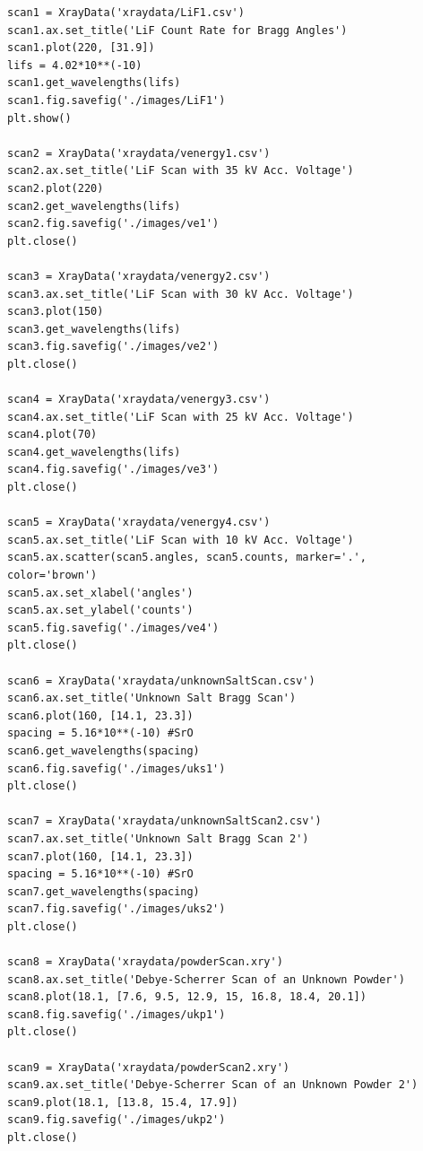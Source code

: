 \documentclass[8pt, a4paper]{article}
\begin{document}
\begin{verbatim}
scan1 = XrayData('xraydata/LiF1.csv')
scan1.ax.set_title('LiF Count Rate for Bragg Angles')
scan1.plot(220, [31.9])
lifs = 4.02*10**(-10)
scan1.get_wavelengths(lifs)
scan1.fig.savefig('./images/LiF1')
plt.show()

scan2 = XrayData('xraydata/venergy1.csv')
scan2.ax.set_title('LiF Scan with 35 kV Acc. Voltage')
scan2.plot(220)
scan2.get_wavelengths(lifs)
scan2.fig.savefig('./images/ve1')
plt.close()

scan3 = XrayData('xraydata/venergy2.csv')
scan3.ax.set_title('LiF Scan with 30 kV Acc. Voltage')
scan3.plot(150)
scan3.get_wavelengths(lifs)
scan3.fig.savefig('./images/ve2')
plt.close()

scan4 = XrayData('xraydata/venergy3.csv')
scan4.ax.set_title('LiF Scan with 25 kV Acc. Voltage')
scan4.plot(70)
scan4.get_wavelengths(lifs)
scan4.fig.savefig('./images/ve3')
plt.close()

scan5 = XrayData('xraydata/venergy4.csv')
scan5.ax.set_title('LiF Scan with 10 kV Acc. Voltage')
scan5.ax.scatter(scan5.angles, scan5.counts, marker='.', color='brown')
scan5.ax.set_xlabel('angles')
scan5.ax.set_ylabel('counts')
scan5.fig.savefig('./images/ve4')
plt.close()

scan6 = XrayData('xraydata/unknownSaltScan.csv')
scan6.ax.set_title('Unknown Salt Bragg Scan')
scan6.plot(160, [14.1, 23.3])
spacing = 5.16*10**(-10) #SrO
scan6.get_wavelengths(spacing)
scan6.fig.savefig('./images/uks1')
plt.close()

scan7 = XrayData('xraydata/unknownSaltScan2.csv')
scan7.ax.set_title('Unknown Salt Bragg Scan 2')
scan7.plot(160, [14.1, 23.3])
spacing = 5.16*10**(-10) #SrO
scan7.get_wavelengths(spacing)
scan7.fig.savefig('./images/uks2')
plt.close()

scan8 = XrayData('xraydata/powderScan.xry')
scan8.ax.set_title('Debye-Scherrer Scan of an Unknown Powder')
scan8.plot(18.1, [7.6, 9.5, 12.9, 15, 16.8, 18.4, 20.1])
scan8.fig.savefig('./images/ukp1')
plt.close()

scan9 = XrayData('xraydata/powderScan2.xry')
scan9.ax.set_title('Debye-Scherrer Scan of an Unknown Powder 2')
scan9.plot(18.1, [13.8, 15.4, 17.9])
scan9.fig.savefig('./images/ukp2')
plt.close()
\end{verbatim}

\newpage
\end{document}
